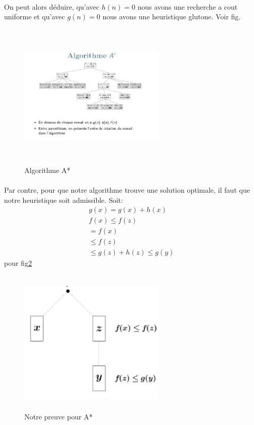 \documentclass[oneside]{book}
\begin{document}
\paragraph{}
On peut alors déduire, qu'avec $h(n) = 0$ nous avons une recherche a cout uniforme et qu'avec $g(n) = 0$ nous avons une heuristique glutone. Voir fig.

\begin{figure}[!ht]
	\centering
	\includegraphics[width = 7cm, height = 7cm, keepaspectratio]{A*.png}
	\caption{Algorithme A*}
	\label{fig:A*}
\end{figure}
\paragraph{}
Par contre, pour que notre algorithme trouve une solution optimale, il faut que notre heuristique soit admissible. Soit:
\begin{align*}
g(x) = g(x) + h(x) \\
f(x) \leq f(z) \\
= f(x)\\
\leq f(z) \\
\leq g(z) + h(z) \leq g(y)
\end{align*}
pour fig\ref{fig:Preuve_A*}
\begin{figure}[!ht]
\centering
\includegraphics[width = 7cm, height = 7cm, keepaspectratio]{Preuve_A*.png}
\caption{Notre preuve pour A*}
\label{fig:Preuve_A*}
\end{figure}
\end{document}
